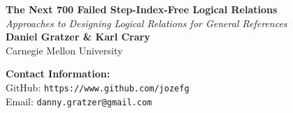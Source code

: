 \documentclass[a0,landscape]{a0poster}
\begin{document}
\begin{minipage}[b]{0.75\linewidth}
  \veryHuge \color{NavyBlue} \textbf{The Next 700 Failed Step-Index-Free Logical Relations}\\ \color{Black}
  \Huge\textit{Approaches to Designing Logical Relations for General References}\\[1cm]
  \huge \textbf{Daniel Gratzer \& Karl Crary}\\
  \huge Carnegie Mellon University\\
\end{minipage}
\begin{minipage}[b]{0.15\linewidth}
  \color{DarkSlateGray}\Large \textbf{Contact Information:}\\
  GitHub: \texttt{https://www.github.com/jozefg}\\
  Email: \texttt{danny.gratzer@gmail.com}\\
\end{minipage}

\vspace{1cm}
\end{document}
